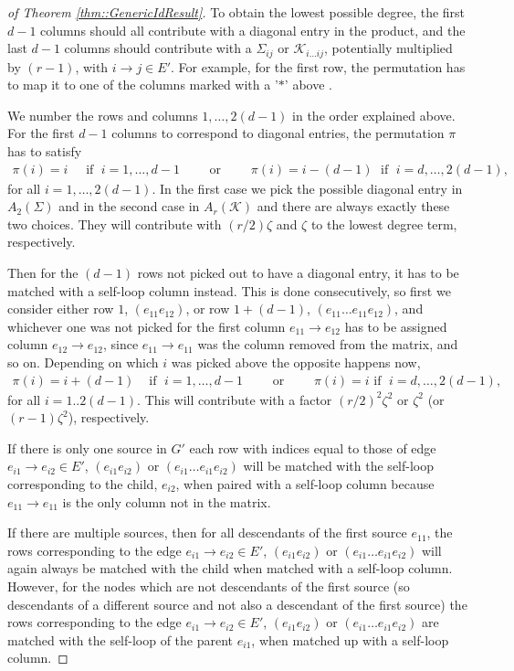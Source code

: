 \documentclass{biometrika}
\begin{document}
\begin{proof}[of Theorem \ref{thm::GenericIdResult}]
To obtain the lowest possible degree, the first $d-1$ columns should all contribute with a diagonal entry in the product, and the last $d-1$ columns should contribute with a $\Sigma_{ij}$ or $ \mathcal{K} _{i \dots ij}$, potentially multiplied by $(r-1)$, with $i \rightarrow j \in E'$. For example, for the first row, the permutation has to map it to one of the columns marked with a '$*$' above . 

We number the rows and columns $1, \dots, 2(d-1)$ in the order explained above. For the first $d-1$ columns to correspond to diagonal entries, the permutation $\pi$ has to satisfy
\begin{align*}
    \pi(i) = i & \; \text{ if } \; i = 1, \dots,d-1 \qquad \text{ or } \qquad \pi(i) = i - (d-1) \; \text{ if } \; i = d, \dots, 2(d-1) ,
\end{align*}
for all $i = 1, \dots, 2(d-1)$.
In the first case we pick the possible diagonal entry in $A_2(\Sigma)$ and in the second case in $A_r(\mathcal{K} )$ and there are always exactly these two choices. They will contribute with $(r/2) \zeta$ and $\zeta$ to the lowest degree term, respectively. 

Then for the $(d-1)$ rows not picked out to have a diagonal entry, it has to be matched with a self-loop column instead. This is done consecutively, so first we consider either row $1$, $(e_{11} e_{12})$, or row $1 + (d-1)$, $(e_{11} \dots e_{11} e_{12})$, and whichever one was not picked for the first column  $e_{11} \rightarrow e_{12} $ has to be assigned column $e_{12} \rightarrow e_{12}$, since $e_{11} \rightarrow e_{11}$ was the column removed from the matrix, and so on. Depending on which $i$ was picked above the opposite happens now,
\begin{align*}
    \pi(i) = i +(d-1) & \text{ if } \; i = 1, \dots,d-1 \qquad \text{ or } \qquad \pi(i) = i  \text{ if }  \; i = d, \dots, 2(d-1),
\end{align*}
for all $i = 1..2(d-1)$. This will contribute with a factor $(r/2)^{2} \zeta^2$ or $\zeta^2$ (or $(r-1) \zeta^2$), respectively. 

If there is only one source in $G'$ each row with indices equal to those of edge $e_{i1} \rightarrow e_{i2} \in E'$, $(e_{i1} e_{i2})$ or $(e_{i1} \dots e_{i1} e_{i2})$ will be matched with the self-loop corresponding to the child, $e_{i2}$, when paired with a self-loop column
 because $e_{11} \rightarrow e_{11}$ is the only column not in the matrix. 

If there are multiple sources, then for all descendants of the first source $e_{11}$, the rows corresponding to the edge $e_{i1} \rightarrow e_{i2} \in E'$, $(e_{i1} e_{i2})$ or $(e_{i1} \dots e_{i1} e_{i2})$ will again always be matched with the child when matched with a self-loop column. However, for the nodes which are not descendants of the first source (so descendants of a different source and not also a descendant of the first source) the  rows corresponding to the edge $e_{i1} \rightarrow e_{i2} \in E'$, $(e_{i1} e_{i2})$ or $(e_{i1} \dots e_{i1} e_{i2})$ are matched with the self-loop of the parent $e_{i1}$, when matched up with a self-loop column. 


\end{proof}
\end{document}
